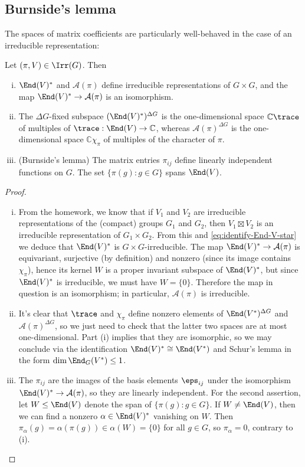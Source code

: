 \documentclass[reqno]{amsart} 
\begin{document}
\subsection{Burnside's lemma}\label{sec:cnh2vopiul}
The spaces of matrix coefficients are particularly well-behaved in the case of an irreducible representation:
\begin{lemma}\label{lem:schur-for-inner-products}
  Let $(\pi,V) \in \Irr(G)$.  Then
  \begin{enumerate}
[(i)]
  \item $\End(V)^*$ and $\mathcal{A}(\pi)$ define irreducible representations of $G \times G$, and the map $\End(V)^* \rightarrow \mathcal{A}(\pi)$ is an isomorphism.
  \item The $\Delta G$-fixed subspace $(\End(V)^*)^{\Delta G}$ is the one-dimensional space $\mathbb{C} \trace$ of multiples of $\trace : \End(V) \rightarrow \mathbb{C}$, whereas $\mathcal{A}(\pi)^{\Delta G}$ is the one-dimensional space $\mathbb{C} \chi_\pi$ of multiples of the character of $\pi$.
  \item (Burnside's lemma) The matrix entries $\pi_{i j}$ define linearly independent functions on $G$.  The set $\{\pi(g) : g \in G\}$ spans $\End(V)$.
  \end{enumerate}
\end{lemma}
\begin{proof}
  \begin{enumerate}
[(i)]
  \item From the homework, we know that if $V_1$ and $V_2$ are irreducible representations of the (compact) groups $G_1$ and $G_2$, then $V_1 \boxtimes V_2$ is an irreducible representation of $G_1 \times G_2$.  From this and \eqref{eq:identify-End-V-star} we deduce that $\End(V)^*$ is $G \times G$-irreducible.  The map $\End(V)^* \rightarrow \mathcal{A}(\pi)$ is equivariant, surjective (by definition) and nonzero (since its image contains $\chi_\pi$), hence its kernel $W$ is a proper invariant subspace of $\End(V)^*$, but since $\End(V)^*$ is irreducible, we must have $W = \{0\}$.  Therefore the map in question is an isomorphism; in particular, $\mathcal{A}(\pi)$ is irreducible.
  \item It's clear that $\trace$ and $\chi_\pi$ define nonzero elements of $\End(V^*)^{\Delta G}$ and $\mathcal{A}(\pi)^{\Delta G}$, so we just need to check that the latter two spaces are at most one-dimensional.  Part (i) implies that they are isomorphic, so we may conclude via the identification $\End(V)^* \cong \End(V^*)$ and Schur's lemma in the form $\dim \End_G(V^*) \leq 1$.
  \item The $\pi_{i j}$ are the images of the basis elements $\eps_{i j}$ under the isomorphism $\End(V)^* \rightarrow \mathcal{A}(\pi)$, so they are linearly independent.  For the second assertion, let $W \leq \End(V)$ denote the span of $\{\pi(g) : g \in G\}$.  If $W \neq \End(V)$, then we can find a nonzero $\alpha \in \End(V)^*$ vanishing on $W$.  Then $\pi_\alpha(g) = \alpha(\pi(g)) \in \alpha(W) = \{0\}$ for all $g \in G$, so $\pi_\alpha = 0$, contrary to (i).
  \end{enumerate}
\end{proof}
\end{document}
